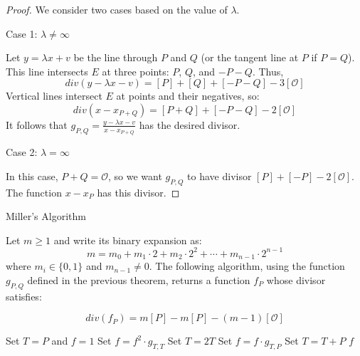 \documentclass{article}
\begin{document}
\begin{proof}


We consider two cases based on the value of $\lambda$.

Case 1: $\lambda \neq \infty$

Let $y = \lambda x + v$ be the line through $P$ and $Q$ (or the tangent line at $P$ if $P = Q$). This line intersects $E$ at three points: $P$, $Q$, and $-P-Q$. Thus,
\begin{equation}
div(y - \lambda x - v) = [P] + [Q] + [-P - Q] - 3[\mathcal{O}]
\end{equation}
Vertical lines intersect $E$ at points and their negatives, so:
\begin{equation}
div(x - x_{P+Q}) = [P + Q] + [-P - Q] - 2[\mathcal{O}]
\end{equation}
It follows that $g_{P,Q} = \frac{y - \lambda x - v}{x - x_{P+Q}}$ has the desired divisor.

Case 2: $\lambda = \infty$

In this case, $P + Q = \mathcal{O}$, so we want $g_{P,Q}$ to have divisor $[P] + [-P] - 2[\mathcal{O}]$. The function $x - x_P$ has this divisor.
\end{proof}

\begin{theorem}{Miller's Algorithm}{}

Let $m \geq 1$ and write its binary expansion as:
\begin{equation}
m = m_0 + m_1 \cdot 2 + m_2 \cdot 2^2 + \cdots + m_{n-1} \cdot 2^{n-1}
\end{equation}
where $m_i \in \{0, 1\}$ and $m_{n-1} \neq 0$.
The following algorithm, using the function $g_{P,Q}$ defined in the previous theorem, returns a function $f_P$ whose divisor satisfies:

    \begin{equation}
        div(f_P) = m[P] - m[P] - (m - 1)[\mathcal{O}]
    \end{equation}

\end{theorem}

\begin{algorithm}
\caption{Miller's Algorithm}\label{alg:miller}
\begin{algorithmic}
\State Set $T = P$ and $f = 1$
    \State Set $f = f^2 \cdot g_{T, T}$
    \State Set $T = 2T$
        \State Set $f = f \cdot g_{T, P}$
        \State Set $T = T + P$
    \EndIf
\EndFor
\State \Return $f$
\end{algorithmic}
\end{algorithm}
\end{document}
